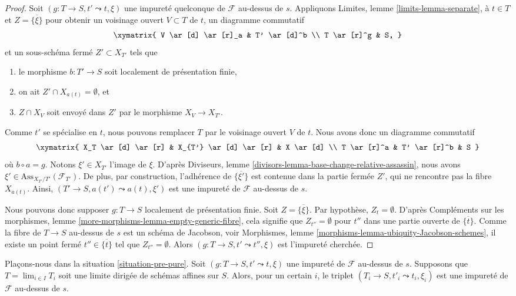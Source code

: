 \begin{proof}
Soit $(g : T \to S, t' \leadsto t, \xi)$ une impureté quelconque de
$\mathcal{F}$ au-dessus de $s$. Appliquons
Limites, lemme \ref{limits-lemma-separate},
à $t \in T$ et $Z = \overline{\{\xi\}}$ pour obtenir un voisinage ouvert
$V \subset T$ de $t$, un diagramme commutatif
$$
\xymatrix{
V \ar[d] \ar[r]_a & T' \ar[d]^b \\
T \ar[r]^g & S,
}
$$
et un sous-schéma fermé $Z' \subset X_{T'}$ tels que
\begin{enumerate}
\item le morphisme $b : T' \to S$ soit localement de présentation finie,
\item on ait $Z' \cap X_{a(t)} = \emptyset$, et
\item $Z \cap X_V$ soit envoyé dans $Z'$ par le morphisme $X_V \to X_{T'}$.
\end{enumerate}
Comme $t'$ se spécialise en $t$, nous pouvons remplacer $T$ par le voisinage ouvert
$V$ de $t$. Nous avons donc un diagramme commutatif
$$
\xymatrix{
X_T \ar[d] \ar[r] &
X_{T'} \ar[d] \ar[r] &
X \ar[d] \\
T \ar[r]^a & T' \ar[r]^b & S
}
$$
où $b \circ a = g$. Notons $\xi' \in X_{T'}$
l'image de $\xi$. D'après
Diviseurs, lemme \ref{divisors-lemma-base-change-relative-assassin},
nous avons $\xi' \in \text{Ass}_{X_{T'}/T'}(\mathcal{F}_{T'})$.
De plus, par construction, l'adhérence de $\overline{\{\xi'\}}$
est contenue dans la partie fermée $Z'$, qui ne rencontre pas la fibre
$X_{a(t)}$. Ainsi, $(T' \to S, a(t') \leadsto a(t), \xi')$
est une impureté de $\mathcal{F}$ au-dessus de $s$.

\medskip\noindent
Nous pouvons donc supposer $g : T \to S$ localement de présentation finie.
Soit $Z = \overline{\{\xi\}}$. Par hypothèse, $Z_t = \emptyset$. D'après
Compléments sur les morphismes, lemme \ref{more-morphisms-lemma-empty-generic-fibre},
cela signifie que $Z_{t''} = \emptyset$ pour $t''$ dans une partie ouverte
de $\overline{\{t\}}$. Comme la fibre de
$T \to S$ au-dessus de $s$ est un schéma de Jacobson, voir
Morphismes, lemme \ref{morphisms-lemma-ubiquity-Jacobson-schemes},
il existe un point fermé $t'' \in \overline{\{t\}}$ tel que
$Z_{t''} = \emptyset$. Alors $(g : T \to S, t' \leadsto t'', \xi)$ est
l'impureté cherchée.
\end{proof}

\begin{lemma}
\label{lemma-impure-limit}
Plaçons-nous dans la situation \ref{situation-pre-pure}.
Soit $(g : T \to S, t' \leadsto t, \xi)$ une impureté de
$\mathcal{F}$ au-dessus de $s$. Supposons que $T = \lim_{i \in I} T_i$
soit une limite dirigée de schémas affines sur $S$. Alors, pour
un certain $i$, le triplet $(T_i \to S, t'_i \leadsto t_i, \xi_i)$
est une impureté de $\mathcal{F}$ au-dessus de $s$.
\end{lemma}

